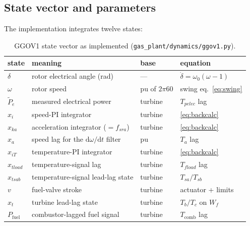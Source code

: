 \documentclass[11pt]{article}
\newcommand{\dd}{\mathrm{d}}
\begin{document}
\subsection{State vector and parameters}

The implementation integrates twelve states:

\begin{table}[h]\centering
\small
\begin{tabular}{llll}
\toprule
state & meaning & base & equation \\
\midrule
$\delta$ & rotor electrical angle (rad) & --- & $\dot\delta = \omega_0(\omega-1)$ \\
$\omega$ & rotor speed & pu of $2\pi 60$ & swing eq.\ \eqref{eq:swing} \\
$\tilde P_e$ & measured electrical power & turbine & $T_{pelec}$ lag \\
$x_i$ & speed-PI integrator & turbine & \eqref{eq:backcalc} \\
$x_{ka}$ & acceleration integrator ($= f_{sra}$) & turbine & \eqref{eq:backcalc} \\
$x_a$ & speed lag for the $\dd\omega/\dd t$ filter & pu & $T_a$ lag \\
$x_{iT}$ & temperature-PI integrator & turbine & \eqref{eq:backcalc} \\
$x_{tload}$ & temperature-signal lag & turbine & $T_{fload}$ lag \\
$x_{tsab}$ & temperature-signal lead-lag state & turbine & $T_{sa}/T_{sb}$ \\
$v$ & fuel-valve stroke & turbine & actuator + limits \\
$x_t$ & turbine lead-lag state & turbine & $T_b/T_c$ on $W_f$ \\
$P_\text{fuel}$ & combustor-lagged fuel signal & turbine & $T_\text{comb}$ lag \\
\bottomrule
\end{tabular}
\caption{GGOV1 state vector as implemented
(\texttt{gas\_plant/dynamics/ggov1.py}).}
\end{table}
\end{document}
